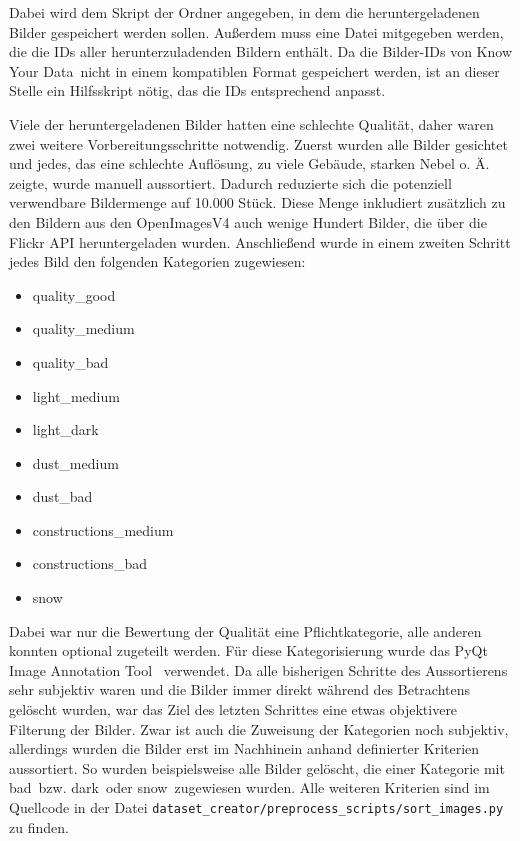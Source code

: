 Dabei wird dem Skript der Ordner angegeben, in dem die heruntergeladenen Bilder
gespeichert werden sollen. Außerdem muss eine Datei mitgegeben werden, die die
IDs aller herunterzuladenden Bildern enthält. Da die Bilder-IDs von \glqq Know
Your Data\grqq\ nicht in einem kompatiblen Format gespeichert werden, ist an
dieser Stelle ein Hilfsskript nötig, das die IDs entsprechend anpasst.


Viele der heruntergeladenen Bilder hatten eine schlechte Qualität, daher waren
zwei weitere Vorbereitungsschritte notwendig. Zuerst wurden alle Bilder
gesichtet und jedes, das eine schlechte Auflösung, zu viele Gebäude, starken
Nebel o. Ä. zeigte, wurde manuell aussortiert. Dadurch reduzierte sich die
potenziell verwendbare Bildermenge auf 10.000 Stück. Diese Menge inkludiert
zusätzlich zu den Bildern aus den OpenImagesV4 auch wenige Hundert Bilder, die
über die Flickr API heruntergeladen wurden. Anschließend wurde in einem zweiten
Schritt jedes Bild den folgenden Kategorien zugewiesen:

\begin{itemize}
	\item quality\_good
	\item quality\_medium
	\item quality\_bad
	\item light\_medium
	\item light\_dark
	\item dust\_medium
	\item dust\_bad
	\item constructions\_medium
	\item constructions\_bad
	\item snow
\end{itemize}

Dabei war nur die Bewertung der Qualität eine Pflichtkategorie, alle anderen
konnten optional zugeteilt werden. Für diese Kategorisierung wurde das \glqq
PyQt Image Annotation Tool\grqq~\cite{brada2022} verwendet. Da alle bisherigen
Schritte des Aussortierens sehr subjektiv waren und die Bilder immer direkt
während des Betrachtens gelöscht wurden, war das Ziel des letzten Schrittes eine
etwas objektivere Filterung der Bilder. Zwar ist auch die Zuweisung der
Kategorien noch subjektiv, allerdings wurden die Bilder erst im Nachhinein
anhand definierter Kriterien aussortiert. So wurden beispielsweise alle Bilder
gelöscht, die einer Kategorie mit \glqq bad\grqq\ bzw. \glqq dark\grqq\ oder
\glqq snow\grqq\ zugewiesen wurden. Alle weiteren Kriterien sind im Quellcode in
der Datei \texttt{dataset\_creator/preprocess\_scripts/sort\_images.py} zu
finden.

